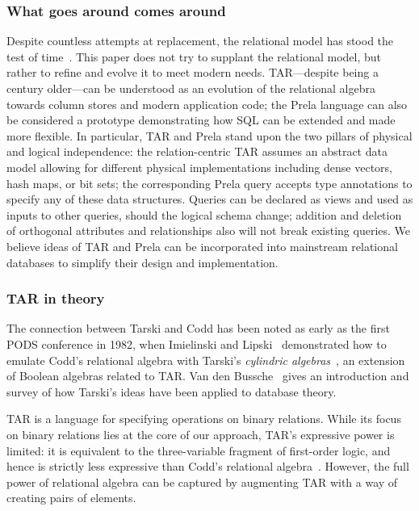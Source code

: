 \documentclass[sigconf,screen,pbalance]{cidr-2027}
\newcommand{\noun}[1]{\textsf{#1}}
\begin{document}
\subsubsection*{What goes around comes around}
Despite countless attempts at replacement, the relational model has stood the test of time~\cite{stonebraker2005what}.
This paper does not try to supplant the relational model, but rather to refine and evolve it to meet modern needs.
\noun{TAR}---despite being a century older---can be understood as an evolution of the relational algebra towards column stores and modern application code; the Prela language can also be considered a prototype demonstrating how SQL can be extended and made more flexible.
In particular, \noun{TAR} and Prela stand upon the two pillars of physical and logical independence: the relation-centric \noun{TAR} assumes an abstract data model allowing for different physical implementations including dense vectors, hash maps, or bit sets; the corresponding Prela query accepts type annotations to specify any of these data structures.
Queries can be declared as views and used as inputs to other queries, should the logical schema change; addition and deletion of orthogonal attributes and relationships also will not break existing queries.
We believe ideas of \noun{TAR} and Prela can be incorporated into mainstream relational databases to simplify their design and implementation.

\subsubsection*{\noun{TAR} in theory}
The connection between Tarski and Codd has been noted as early as the first \noun{PODS} conference in 1982, when Imielinski and Lipski~\cite{DBLP:journals/jcss/ImielinskiL84} demonstrated how to emulate Codd's relational algebra with Tarski's \emph{cylindric algebras}~\cite{henkin1971cylindric}, an extension of Boolean algebras related to \noun{TAR}.
Van den Bussche~\cite{DBLP:conf/csl/Bussche01} gives an introduction and survey of how Tarski's ideas have been applied to database theory.

\noun{TAR} is a language for specifying operations on binary relations.
While its focus on binary relations lies at the core of our approach, \noun{TAR}'s expressive power is limited: it is equivalent to the three-variable fragment of first-order logic, and hence is strictly less expressive than Codd's relational algebra~\cite{DBLP:conf/csl/Bussche01}.
However, the full power of relational algebra can be captured by augmenting \noun{TAR} with a way of creating pairs of elements.
\end{document}
